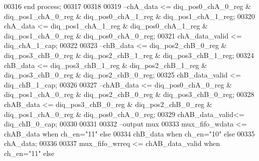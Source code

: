 \begin{DoxyCode}
00316     \textcolor{keywordflow}{end} \textcolor{keywordflow}{process};
00317     
00318     
00319 \textcolor{keyword}{--chA\_data       <= diq\_pos0\_chA\_0\_reg & diq\_pos1\_chA\_0\_reg & diq\_pos0\_chA\_1\_reg & diq\_pos1\_chA\_1\_reg;}
00320 \textcolor{vhdlchar}{chA_data}       \textcolor{vhdlchar}{<=}   \textcolor{vhdlchar}{diq_pos1_chA_1_reg} \textcolor{vhdlchar}{&} \textcolor{vhdlchar}{diq_pos0_chA_1_reg} \textcolor{vhdlchar}{&} \textcolor{vhdlchar}{diq_pos1_chA_0_reg} \textcolor{vhdlchar}{&} \textcolor{vhdlchar}{
      diq_pos0_chA_0_reg};     
00321 \textcolor{vhdlchar}{chA_data_valid} \textcolor{vhdlchar}{<=} \textcolor{vhdlchar}{diq_chA_1_cap};
00322 
00323 \textcolor{keyword}{--chB\_data         <= diq\_pos2\_chB\_0\_reg & diq\_pos3\_chB\_0\_reg & diq\_pos2\_chB\_1\_reg & diq\_pos3\_chB\_1\_reg;}
00324 \textcolor{vhdlchar}{chB_data}           \textcolor{vhdlchar}{<=} \textcolor{vhdlchar}{diq_pos3_chB_1_reg} \textcolor{vhdlchar}{&} \textcolor{vhdlchar}{diq_pos2_chB_1_reg} \textcolor{vhdlchar}{&} \textcolor{vhdlchar}{
      diq_pos3_chB_0_reg} \textcolor{vhdlchar}{&} \textcolor{vhdlchar}{diq_pos2_chB_0_reg};
00325 \textcolor{vhdlchar}{chB_data_valid} \textcolor{vhdlchar}{<=} \textcolor{vhdlchar}{diq_chB_1_cap};
00326 
00327 \textcolor{keyword}{--chAB\_data      <= diq\_pos0\_chA\_0\_reg & diq\_pos1\_chA\_0\_reg & diq\_pos2\_chB\_0\_reg & diq\_pos3\_chB\_0\_reg;}
00328 \textcolor{vhdlchar}{chAB_data}      \textcolor{vhdlchar}{<=} \textcolor{vhdlchar}{diq_pos3_chB_0_reg} \textcolor{vhdlchar}{&} \textcolor{vhdlchar}{diq_pos2_chB_0_reg} \textcolor{vhdlchar}{&} \textcolor{vhdlchar}{diq_pos1_chA_0_reg} \textcolor{vhdlchar}{&} \textcolor{vhdlchar}{
      diq_pos0_chA_0_reg};
00329 \textcolor{vhdlchar}{chAB_data_valid}\textcolor{vhdlchar}{<=} \textcolor{vhdlchar}{diq_chB_0_cap};
00330 
00331 
00332 \textcolor{keyword}{--output mux}
00333 \textcolor{vhdlchar}{mux_fifo_wdata} \textcolor{vhdlchar}{<=}   \textcolor{vhdlchar}{chAB_data} \textcolor{keywordflow}{when} \textcolor{vhdlchar}{ch_en}\textcolor{vhdlchar}{=}\textcolor{vhdllogic}{"11"} \textcolor{keywordflow}{else} 
00334                     \textcolor{vhdlchar}{chB_data} \textcolor{keywordflow}{when} \textcolor{vhdlchar}{ch_en}\textcolor{vhdlchar}{=}\textcolor{vhdllogic}{"10"} \textcolor{keywordflow}{else}
00335                     \textcolor{vhdlchar}{chA_data};
00336                
00337 \textcolor{vhdlchar}{mux_fifo_wrreq} \textcolor{vhdlchar}{<=}   \textcolor{vhdlchar}{chAB_data_valid} \textcolor{keywordflow}{when} \textcolor{vhdlchar}{ch_en}\textcolor{vhdlchar}{=}\textcolor{vhdllogic}{"11"} \textcolor{keywordflow}{else} 

\end{DoxyCode}

